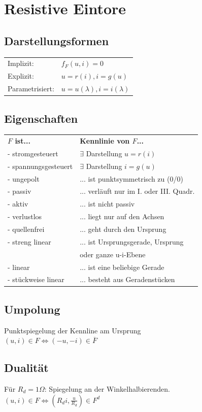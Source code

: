 \documentclass[a4paper,twocolumn,10pt]{article}
\begin{document}
\section*{Resistive Eintore}
\subsection*{Darstellungsformen}
\begin{tabular}{ll}
Implizit: & $f_F(u,i)=0$\\
Explizit: & $u=r(i), i=g(u)$\\
Parametrisiert: & $u=u(\lambda), i=i(\lambda)$
\end{tabular}

\subsection*{Eigenschaften}
\begin{tabular}{ll}
\textbf{$F$ ist...} & \textbf{Kennlinie von $F$...}\\
- stromgesteuert & $\exists$ Darstellung $u=r(i)$\\
- spannungsgesteuert & $\exists$ Darstellung $i=g(u)$\\
- ungepolt & ... ist punktsymmetrisch zu (0/0)\\
- passiv & ... verläuft nur im I. oder III. Quadr.\\
- aktiv & ... ist nicht passiv\\
- verlustlos & ... liegt nur auf den Achsen\\
- quellenfrei & ... geht durch den Ursprung\\
- streng linear & ... ist Ursprungsgerade, Ursprung\\
 & \;\;\;\;oder ganze u-i-Ebene\\
- linear & ... ist eine beliebige Gerade\\
- stückweise linear & ... besteht aus Geradenstücken
\end{tabular}

\subsection*{Umpolung}
Punktspiegelung der Kennline am Ursprung\\
$(u,i)\in F \Leftrightarrow (-u,-i)\in \overline{F}$

\subsection*{Dualität}
Für $R_d=1 \Omega$: Spiegelung an der Winkelhalbierenden.\\
$(u,i)\in F \Leftrightarrow (R_di,\frac{u}{R_d})\in F^d$
\end{document}
